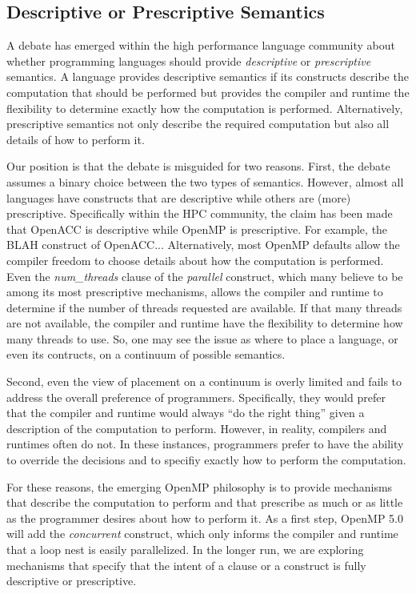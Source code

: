 \subsection{Descriptive or Prescriptive Semantics}
\label{sub:descriptive}

A debate has emerged within the high performance language
community about whether programming languages should 
provide \emph{descriptive} or \emph{prescriptive} semantics. 
A language provides descriptive semantics if its constructs 
describe the computation that should be performed but provides 
the compiler and runtime the flexibility to determine exactly 
how the computation is performed. Alternatively, prescriptive
semantics not only describe the required computation but 
also all details of how to perform it.

Our position is that the debate is misguided for two reasons.
First, the debate assumes a binary choice between the two 
types of semantics. However, almost all languages have constructs 
that are descriptive while others are (more) prescriptive. 
Specifically within the HPC community, the claim has been 
made that OpenACC is descriptive while OpenMP is prescriptive.
For example, the BLAH construct of OpenACC...
Alternatively, most OpenMP defaults allow the compiler freedom
to choose details about how the computation is performed. Even
the \emph{num\_threads} clause of the \emph{parallel} construct,
which many believe to be among its most prescriptive mechanisms,
allows the compiler and runtime to determine if the number of
threads requested are available. If that many threads are not
available, the compiler and runtime have the flexibility to
determine how many threads to use. So, one may see the issue 
as where to place a language, or even its contructs, on a 
continuum of possible semantics.

Second, even the view of placement on a continuum is overly
limited and fails to address the overall preference of 
programmers. Specifically, they would prefer that the compiler
and runtime would always ``do the right thing'' given a 
description of the computation to perform. However, in reality,
compilers and runtimes often do not. In these instances,
programmers prefer to have the ability to override the
decisions and to specifiy exactly how to perform the computation.

For these reasons, the emerging OpenMP philosophy is to provide
mechanisms that describe the computation to perform and that
prescribe as much or as little as the programmer desires about
how to perform it. As a first step, OpenMP 5.0 will add the 
\emph{concurrent} construct, which only informs the compiler 
and runtime that a loop nest is easily parallelized. In the 
longer run, we are exploring mechanisms that specify that the 
intent of a clause or a construct is fully descriptive or prescriptive.
